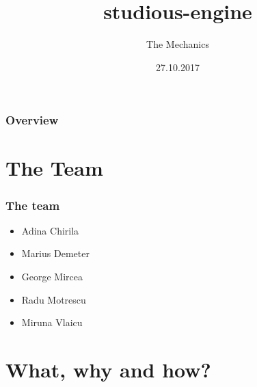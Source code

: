 \documentclass{beamer}
\title[studious-engine]{studious-engine} %
\author{The Mechanics} %
\date{27.10.2017} %
\begin{document}
\begin{frame}
\titlepage %
\end{frame}

\begin{frame}
\frametitle{Overview} %
\tableofcontents %
\end{frame}


\section{The Team} %

\begin{frame}
\frametitle{The team}
\begin{itemize}
\item Adina Chirila
\item Marius Demeter
\item George Mircea
\item Radu Motrescu
\item Miruna Vlaicu
\end{itemize}
\end{frame}

\section{What, why and how?}
\end{document}
